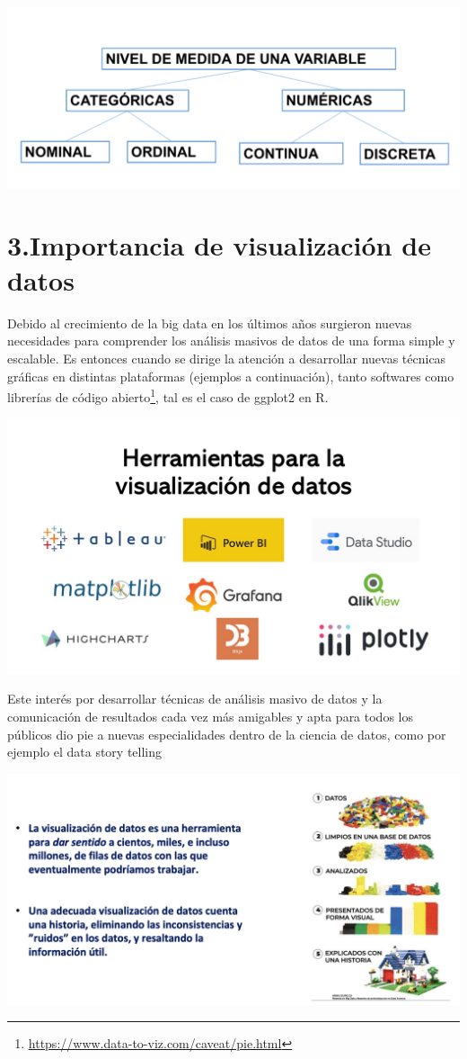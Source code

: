\documentclass[
]{article}
\begin{document}
\begin{center}\includegraphics[width=0.5\linewidth]{pd2_medVar} \end{center}

\hypertarget{importancia-de-visualizaciuxf3n-de-datos}{%
\section{\texorpdfstring{\textbf{3.Importancia de visualización de
datos}}{3.Importancia de visualización de datos}}\label{importancia-de-visualizaciuxf3n-de-datos}}

Debido al crecimiento de la big data en los últimos años surgieron
nuevas necesidades para comprender los análisis masivos de datos de una
forma simple y escalable. Es entonces cuando se dirige la atención a
desarrollar nuevas técnicas gráficas en distintas plataformas (ejemplos
a continuación), tanto softwares como librerías de código
abierto\footnote{\url{https://www.data-to-viz.com/caveat/pie.html}}, tal
es el caso de ggplot2 en R.

\begin{center}\includegraphics[width=0.9\linewidth]{pd2_herramientas} \end{center}

Este interés por desarrollar técnicas de análisis masivo de datos y la
comunicación de resultados cada vez más amigables y apta para todos los
públicos dio pie a nuevas especialidades dentro de la ciencia de datos,
como por ejemplo el data story telling

\begin{center}\includegraphics[width=0.9\linewidth]{pd2_datavis} \end{center}
\end{document}
